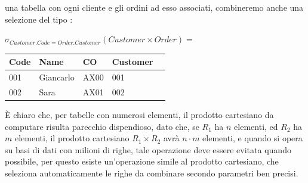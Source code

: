 \documentclass[12pt, letterpaper]{article}
\begin{document}
 una tabella con ogni cliente e gli ordini ad esso associati, combineremo anche una selezione del tipo :
 \begin{center}
    \(\sigma_{Customer.Code=Order.Customer}(Customer\times Order) =\)
    \begin{tabular}{|l|l|l|l|r|}
        \hline
        Code & Name & CO & Customer  \\
        \hline
        001 & Giancarlo & AX00 & 001 \\\hline
        002 & Sara & AX01 & 002 \\
        \hline
        \end{tabular}
 \end{center}
 È chiaro che, per tabelle con numerosi elementi, il prodotto cartesiano da computare risulta parecchio 
 dispendioso, dato che, se \(R_1\) ha \(n\) elementi, ed \(R_2\) ha \(m\) elementi, il prodotto cartesiano 
 \(R_1\times R_2\) avrà \(n\cdot m\) elementi, e quando si opera su basi di dati con milioni di righe, tale operazione 
 deve essere evitata quando possibile, per questo esiste un'operazione simile al prodotto cartesiano, 
 che seleziona automaticamente le righe da combinare secondo parametri ben precisi.\newpage
\end{document}
